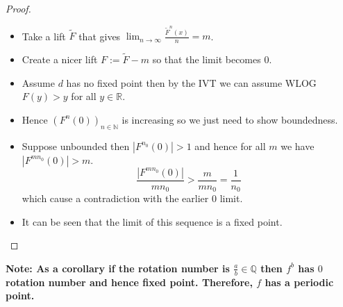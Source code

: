 \documentclass[11pt]{article}
\newcommand{\defeq}{:=}
\newcommand{\abs}[1]{|#1|}
\newcommand{\R}{\mathbb{R}}
\newcommand{\N}{\mathbb{N}}
\newcommand{\Q}{\mathbb{Q}}
\newenvironment{note}
	{\begin{mdframed}[backgroundcolor=white, linecolor=red, roundcorner=5pt, linewidth=1pt]\bfseries{Note:}\normalfont
	\setlength{\parindent}{0pt}}
	{\end{mdframed}}
\begin{document}
\begin{proof}
\begin{itemize}
	\item Take a lift $\widetilde{F}$ that gives $\lim_{n\to\infty}\frac{\widetilde{F}^n(x)}{n}=m$.
	\item Create a nicer lift $F\defeq\widetilde{F}-m$ so that the limit becomes $0$.
	\item Assume $d$ has no fixed point then by the IVT we can assume WLOG $F(y) > y$ for all $y\in\R$.
	\item Hence $\left(F^n(0)\right)_{n\in\N}$ is increasing so we just need to show boundedness.
	\item Suppose unbounded then $\abs{F^{n_0}(0)}>1$ and hence for all $m$ we have $\abs{F^{mn_0}(0)} > m$.
		\[
			\frac{\abs{F^{mn_0}(0)}}{mn_0} > \frac{m}{mn_0} = \frac{1}{n_0}
		\]
		which cause a contradiction with the earlier $0$ limit.
	\item It can be seen that the limit of this sequence is a fixed point.
\end{itemize}
\end{proof}

\begin{note}
	As a corollary if the rotation number is $\frac{a}{b}\in\Q$ then $f^b$ has $0$ rotation number and hence fixed point.
	Therefore, $f$ has a periodic point.
\end{note}
\end{document}

